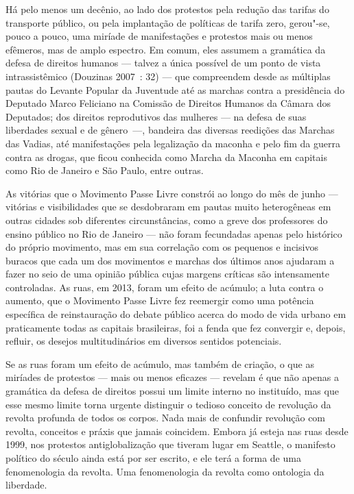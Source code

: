 Há pelo menos um decênio, ao lado dos protestos pela redução das tarifas
do transporte público, ou pela implantação de políticas de tarifa zero,
gerou"-se, pouco a pouco, uma miríade de manifestações e protestos mais
ou menos efêmeros, mas de amplo espectro. Em comum, eles assumem a
gramática da defesa de direitos humanos --- talvez a única possível de um
ponto de vista intrassistêmico (Douzinas 2007~: 32) --- que compreendem
desde as múltiplas pautas do Levante Popular da Juventude até as marchas
contra a presidência do Deputado Marco Feliciano na Comissão de Direitos
Humanos da Câmara dos Deputados; dos direitos reprodutivos das mulheres
--- na defesa de suas liberdades sexual e de gênero~---, bandeira das
diversas reedições das Marchas das Vadias, até manifestações pela
legalização da maconha e pelo fim da guerra contra as drogas, que ficou
conhecida como Marcha da Maconha em capitais como Rio de Janeiro e São
Paulo, entre outras.

As vitórias que o Movimento Passe Livre constrói ao longo do mês de
junho --- vitórias e visibilidades que se desdobraram em pautas muito
heterogêneas em outras cidades sob diferentes circunstâncias, como a
greve dos professores do ensino público no Rio de Janeiro --- não foram
fecundadas apenas pelo histórico do próprio movimento, mas em sua
correlação com os pequenos e incisivos buracos que cada um dos
movimentos e marchas dos últimos anos ajudaram a fazer no seio de uma
opinião pública cujas margens críticas são intensamente controladas. As
ruas, em 2013, foram um efeito de acúmulo; a luta contra o aumento, que
o Movimento Passe Livre fez reemergir como uma potência específica de
reinstauração do debate público acerca do modo de vida urbano em
praticamente todas as capitais brasileiras, foi a fenda que fez
convergir e, depois, refluir, os desejos multitudinários em diversos
sentidos potenciais.

Se as ruas foram um efeito de acúmulo, mas também de criação, o que as
miríades de protestos --- mais ou menos eficazes --- revelam é que não
apenas a gramática da defesa de direitos possui um limite interno no
instituído, mas que esse mesmo limite torna urgente distinguir o tedioso
conceito de revolução da revolta profunda de todos os corpos. Nada mais
de confundir revolução com revolta, conceitos e práxis que jamais
coincidem. Embora já esteja nas ruas desde 1999, nos protestos
antiglobalização que tiveram lugar em Seattle, o manifesto
político do século  ainda está por ser escrito, e ele terá a forma de
uma fenomenologia da revolta. Uma fenomenologia da revolta como
ontologia da liberdade.


